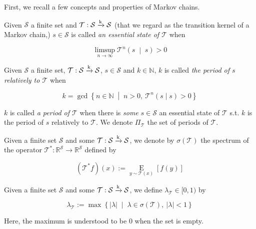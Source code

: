 \documentclass[anon,12pt]{colt2018} %
\newcommand{\AP}[1]{\left(#1\right)}
\newcommand{\AB}[1]{\left[#1\right]}
\newcommand{\APM}[2]{\left(#1\;\middle\vert\;#2\right)}
\newcommand{\ACM}[2]{\left\{#1\;\middle\vert\;#2\right\}}
\newcommand{\Ea}[2]{\underset{#1}{\operatorname{E}}\AB{#2}}
\newcommand{\Nats}{\mathbb{N}}
\newcommand{\Reals}{\mathbb{R}}
\newcommand{\Abs}[1]{\left\vert #1 \right\vert}
\newcommand{\K}{\xrightarrow{\textnormal{k}}}
\newcommand{\St}{\mathcal{S}}
\newcommand{\T}{\mathcal{T}}
\begin{document}
First, we recall a few concepts and properties of Markov chains.

\begin{samepage}
\begin{definition}

Given $\St$ a finite set and $\T: \St \K \St$ (that we regard as the transition kernel of a Markov chain,) $s \in \St$ is called \emph{an essential state of $\T$} when

\begin{equation}
\limsup_{n \rightarrow \infty} {\T^n\APM{s}{s}} > 0
\end{equation}

\end{definition}
\end{samepage}

\begin{samepage}
\begin{definition}

Given $\St$ a finite set, $\T: \St \K \St$, $s \in \St$ and $k \in \Nats$, $k$ is called \emph{the period of $s$ relatively to $\T$} when 

\begin{equation}
k = \gcd \ACM{n \in \Nats}{n > 0,\ \T^n(s \mid s) > 0}
\end{equation}

$k$ is called \emph{a period of $\T$} when there is \emph{some} $s \in \St$ an essential state of $\T$ s.t. $k$ is the period of $s$ relatively to $\T$. We denote $\Pi_\T$ the set of periods of $\T$.

\end{definition}
\end{samepage}

Given a finite set $\St$ and some $\T: \St \K \St$, we denote by $\sigma(\T)$ the spectrum of the operator $\T^*: \Reals^\St \rightarrow \Reals^\St$ defined by

\[\AP{\T^*f}(x):=\Ea{y\sim \T(x)}{f(y)}\]

\begin{samepage}
\begin{definition}

Given a finite set $\St$ and some $\T: \St \K \St$, we define $\lambda_\T\in[0,1)$ by

\begin{equation}
\lambda_\T := \max\ACM{\Abs{\lambda}}{\lambda \in \sigma\AP{\T},\ \Abs{\lambda} < 1}
\end{equation}

Here, the maximum is understood to be 0 when the set is empty.

\end{definition}
\end{samepage}
\end{document}
